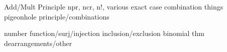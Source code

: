 \documentclass[11pt,letterpaper]{article}
\begin{document}










Add/Mult Principle
npr, ncr, n!, various exact case
combination things
pigeonhole principle/combinations

number function/surj/injection
inclusion/exclusion
binomial thm
dearrangements/other
\end{document}
